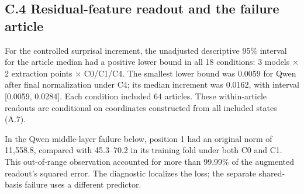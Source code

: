 \subsection{C.4 Residual-feature readout and the failure article}\label{c.4-residual-feature-readout-and-the-failure-article}

For the controlled surprisal increment, the unadjusted descriptive 95\% interval for the article median had a positive lower bound in all 18 conditions: 3 models × 2 extraction points × C0/C1/C4. The smallest lower bound was 0.0059 for Qwen after final normalization under C4; its median increment was 0.0162, with interval {[}0.0059, 0.0284{]}. Each condition included 64 articles. These within-article readouts are conditional on coordinates constructed from all included states (A.7).

In the Qwen middle-layer failure below, position 1 had an original norm of 11,558.8, compared with 45.3--70.2 in its training fold under both C0 and C1. This out-of-range observation accounted for more than 99.99\% of the augmented readout's squared error. The diagnostic localizes the loss; the separate shared-basis failure uses a different predictor.

